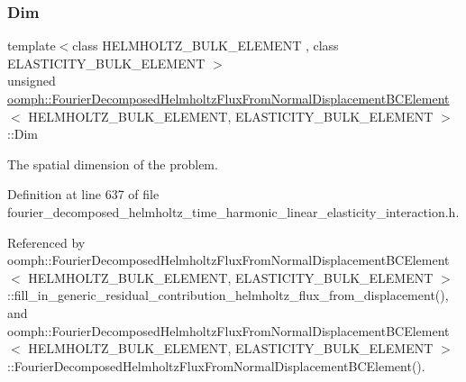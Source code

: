 \subsubsection{\texorpdfstring{Dim}{Dim}}
{\footnotesize\ttfamily template$<$class H\+E\+L\+M\+H\+O\+L\+T\+Z\+\_\+\+B\+U\+L\+K\+\_\+\+E\+L\+E\+M\+E\+NT , class E\+L\+A\+S\+T\+I\+C\+I\+T\+Y\+\_\+\+B\+U\+L\+K\+\_\+\+E\+L\+E\+M\+E\+NT $>$ \\
unsigned \hyperlink{classoomph_1_1FourierDecomposedHelmholtzFluxFromNormalDisplacementBCElement}{oomph\+::\+Fourier\+Decomposed\+Helmholtz\+Flux\+From\+Normal\+Displacement\+B\+C\+Element}$<$ H\+E\+L\+M\+H\+O\+L\+T\+Z\+\_\+\+B\+U\+L\+K\+\_\+\+E\+L\+E\+M\+E\+NT, E\+L\+A\+S\+T\+I\+C\+I\+T\+Y\+\_\+\+B\+U\+L\+K\+\_\+\+E\+L\+E\+M\+E\+NT $>$\+::Dim\hspace{0.3cm}{\ttfamily [private]}}



The spatial dimension of the problem. 



Definition at line 637 of file fourier\+\_\+decomposed\+\_\+helmholtz\+\_\+time\+\_\+harmonic\+\_\+linear\+\_\+elasticity\+\_\+interaction.\+h.



Referenced by oomph\+::\+Fourier\+Decomposed\+Helmholtz\+Flux\+From\+Normal\+Displacement\+B\+C\+Element$<$ H\+E\+L\+M\+H\+O\+L\+T\+Z\+\_\+\+B\+U\+L\+K\+\_\+\+E\+L\+E\+M\+E\+N\+T, E\+L\+A\+S\+T\+I\+C\+I\+T\+Y\+\_\+\+B\+U\+L\+K\+\_\+\+E\+L\+E\+M\+E\+N\+T $>$\+::fill\+\_\+in\+\_\+generic\+\_\+residual\+\_\+contribution\+\_\+helmholtz\+\_\+flux\+\_\+from\+\_\+displacement(), and oomph\+::\+Fourier\+Decomposed\+Helmholtz\+Flux\+From\+Normal\+Displacement\+B\+C\+Element$<$ H\+E\+L\+M\+H\+O\+L\+T\+Z\+\_\+\+B\+U\+L\+K\+\_\+\+E\+L\+E\+M\+E\+N\+T, E\+L\+A\+S\+T\+I\+C\+I\+T\+Y\+\_\+\+B\+U\+L\+K\+\_\+\+E\+L\+E\+M\+E\+N\+T $>$\+::\+Fourier\+Decomposed\+Helmholtz\+Flux\+From\+Normal\+Displacement\+B\+C\+Element().

\mbox{\label{classoomph_1_1FourierDecomposedHelmholtzFluxFromNormalDisplacementBCElement_a5b1225f509b692ab0027477785a56d35}} 
